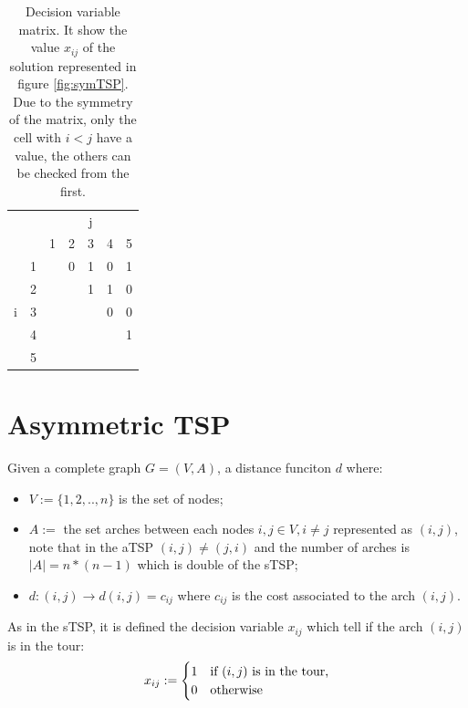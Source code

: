 \begin{table}[h!]
	\begin{center}
		\caption{Decision variable matrix. It show the value $ x_{ij} $ of the solution represented in figure \ref{fig:symTSP}. Due to the symmetry of the matrix, only the cell with $ i < j $ have a value, the others can be checked from the first.}
		\label{tab:symTSP_solution}
		\begin{tabular}{cc|c|c|c|c|c|}
			 \multicolumn{2}{c}{} & \multicolumn{5}{c}{j} \\ %
			& \multicolumn{1}{c}{} & \multicolumn{1}{c}{1} & \multicolumn{1}{c}{2} & \multicolumn{1}{c}{3} & \multicolumn{1}{c}{4} & \multicolumn{1}{c}{5} \\ \cline{3-7}
			\multirow{5}{*}{i} 	& 1 & \cellcolor{Black} & 0 & 1 & 0 & 1 \\ \cline{3-7}
								& 2 &  & \cellcolor{Black} & 1 & 1 & 0 \\ \cline{3-7}
								& 3 &  &  & \cellcolor{Black} & 0 & 0 \\ \cline{3-7}
								& 4 &  &  &  & \cellcolor{Black} & 1 \\ \cline{3-7}
								& 5 &  &  &  &  & \cellcolor{Black} \\ \cline{3-7}
		\end{tabular}
	\end{center}
\end{table}



\section{Asymmetric TSP}
Given a complete graph $ G = (V,A) $, a distance funciton  $ d $ where:
\begin{itemize}
	\item $ V:= \{1, 2, .., n\} $ is the set of nodes;
	\item $ A := $ the set arches between each nodes $ i,j \in V, i \ne j$ represented as $ (i,j) $, note that in the aTSP $ (i,j) \ne (j,i) $ and the number of arches is $ |A| = n*(n-1) $ which is double of the sTSP;
	\item $ d: (i,j) \rightarrow d(i,j) = c_{ij} $ where $ c_{ij} $ is the cost associated to the arch $ (i,j) $.
\end{itemize}
As in the sTSP, it is defined the decision variable $ x_{ij} $ which tell if the arch $ (i,j) $ is in the tour:
\[
x_{ij} := \begin{cases}
1 & \text{if $ (i,j) $ is in the tour,} \\
0 & \text{otherwise}
\end{cases}
\]

